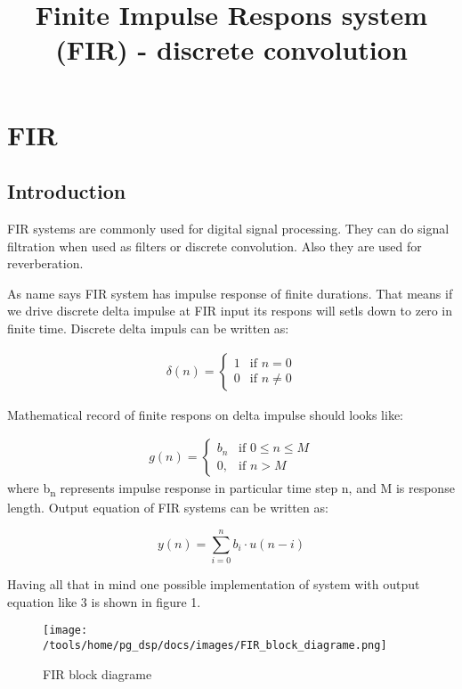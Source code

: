 \documentclass[a4paper, 12pt]{article}
\begin{document}
\title{Finite Impulse Respons system (FIR) - discrete convolution}
\date{}
\maketitle
\section{FIR}
\subsection{Introduction}

FIR systems are commonly used for digital signal processing. They can do signal filtration when used as filters or discrete convolution. Also they are used for reverberation.

As name says FIR system has impulse response of finite durations. That means if we drive discrete delta impulse at FIR input its respons will setls down to zero in finite time. Discrete delta impuls can be written as:

\begin{align}
	\delta(n) = 
	\left\{
		\begin{array}{ll}
			1 & \mbox{if } n = 0 \\
			0 & \mbox{if } n \neq 0
		\end{array}
	\right.		
\end{align}

Mathematical record of finite respons on delta impulse should looks like:

\begin{align}
	g(n) =
	\left\{
		\begin{array}{ll}
			b_n & \mbox{if } 0 \leq n \leq M \\
			0, & \mbox{if } n > M		
		\end{array}
	\right.
\end{align} where b\textsubscript{n} represents impulse response in particular time step n, and M is response length. Output equation of FIR systems can be written as:

\begin{equation}\label{eq:FIR output equation}
y(n) = \sum_{i=0}^{n}{b_{i} \cdot u(n-i)}
\end{equation}

Having all that in mind one possible implementation of system with output equation like 3 is shown in figure 1.

\begin{figure}[h]
\texttt{[image: /tools/home/pg\_dsp/docs/images/FIR\_block\_diagrame.png]}
\caption{FIR block diagrame}
\label{fig:FIR block diagrame}
\end{figure}
\end{document}
